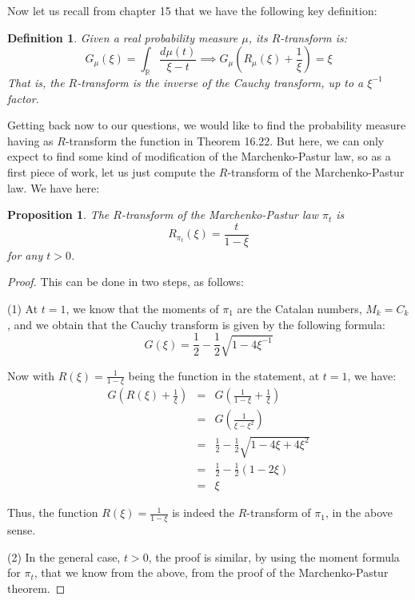 \documentclass[12pt]{amsbook}
\newtheorem{definition}[theorem]{Definition}
\newtheorem{proposition}[theorem]{Proposition}
\begin{document}
Now let us recall from chapter 15 that we have the following key definition:

\begin{definition}
Given a real probability measure $\mu$, its $R$-transform is:
$$G_\mu(\xi)=\int_\mathbb R\frac{d\mu(t)}{\xi-t}\implies 
G_\mu\left(R_\mu(\xi)+\frac{1}{\xi}\right)=\xi$$
That is, the $R$-transform is the inverse of the Cauchy transform, up to a $\xi^{-1}$ factor.
\end{definition}

Getting back now to our questions, we would like to find the probability measure having as $R$-transform the function in Theorem 16.22. But here, we can only expect to find some kind of modification of the Marchenko-Pastur law, so as a first piece of work, let us just compute the $R$-transform of the Marchenko-Pastur law. We have here:

\begin{proposition}
The $R$-transform of the Marchenko-Pastur law $\pi_t$ is
$$R_{\pi_t}(\xi)=\frac{t}{1-\xi}$$ 
for any $t>0$.
\end{proposition}

\begin{proof}
This can be done in two steps, as follows:

\medskip

(1) At $t=1$, we know that the moments of $\pi_1$ are the Catalan numbers, $M_k=C_k$, and we obtain that the Cauchy transform is given by the following formula:
$$G(\xi)=\frac{1}{2}-\frac{1}{2}\sqrt{1-4\xi^{-1}}$$

Now with $R(\xi)=\frac{1}{1-\xi}$ being the function in the statement, at $t=1$, we have:
\begin{eqnarray*}
G\left(R(\xi)+\frac{1}{\xi}\right)
&=&G\left(\frac{1}{1-\xi}+\frac{1}{\xi}\right)\\
&=&G\left(\frac{1}{\xi-\xi^2}\right)\\
&=&\frac{1}{2}-\frac{1}{2}\sqrt{1-4\xi+4\xi^2}\\
&=&\frac{1}{2}-\frac{1}{2}(1-2\xi)\\
&=&\xi
\end{eqnarray*}

Thus, the function $R(\xi)=\frac{1}{1-\xi}$ is indeed the $R$-transform of $\pi_1$, in the above sense.

\medskip

(2) In the general case, $t>0$, the proof is similar, by using the moment formula for $\pi_t$, that we know from the above, from the proof of the Marchenko-Pastur theorem.
\end{proof}
\end{document}
